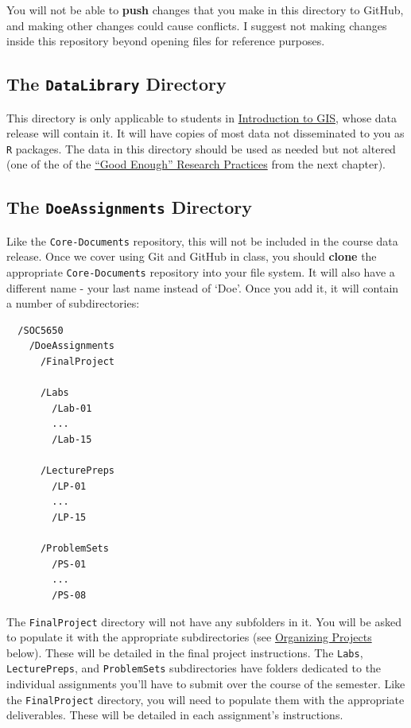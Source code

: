 \documentclass[]{book}
\theoremstyle{definition}
\theoremstyle{definition}
\theoremstyle{definition}
\theoremstyle{remark}
\begin{document}
You will not be able to \textbf{push} changes that you make in this
directory to GitHub, and making other changes could cause conflicts. I
suggest not making changes inside this repository beyond opening files
for reference purposes.

\subsection{\texorpdfstring{The \texttt{DataLibrary}
Directory}{The DataLibrary Directory}}\label{the-datalibrary-directory}

This directory is only applicable to students in
\href{https://slu-soc5650.github.io}{Introduction to GIS}, whose data
release will contain it. It will have copies of most data not
disseminated to you as \texttt{R} packages. The data in this directory
should be used as needed but not altered (one of the of the
\protect\hyperlink{good-enough-research-practices}{``Good Enough''
Research Practices} from the next chapter).

\subsection{\texorpdfstring{The \texttt{DoeAssignments}
Directory}{The DoeAssignments Directory}}\label{the-doeassignments-directory}

Like the \texttt{Core-Documents} repository, this will not be included
in the course data release. Once we cover using Git and GitHub in class,
you should \textbf{clone} the appropriate \texttt{Core-Documents}
repository into your file system. It will also have a different name -
your last name instead of `Doe'. Once you add it, it will contain a
number of subdirectories:

\begin{verbatim}
  /SOC5650
    /DoeAssignments
      /FinalProject

      /Labs
        /Lab-01
        ...
        /Lab-15

      /LecturePreps
        /LP-01
        ...
        /LP-15
        
      /ProblemSets
        /PS-01
        ...
        /PS-08
\end{verbatim}

The \texttt{FinalProject} directory will not have any subfolders in it.
You will be asked to populate it with the appropriate subdirectories
(see \protect\hyperlink{organizing-projects}{Organizing Projects}
below). These will be detailed in the final project instructions. The
\texttt{Labs}, \texttt{LecturePreps}, and \texttt{ProblemSets}
subdirectories have folders dedicated to the individual assignments
you'll have to submit over the course of the semester. Like the
\texttt{FinalProject} directory, you will need to populate them with the
appropriate deliverables. These will be detailed in each assignment's
instructions.
\end{document}
